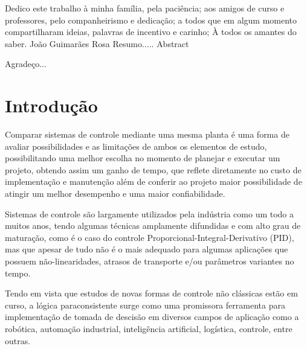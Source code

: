 \documentclass[12pt,a4paper]{report}
\begin{document}
\capa
\folhaderosto
\fichacatalografica
\folhadeaprovacao
\dedicatoria
{
      Dedico este trabalho à minha família, 
      pela paciência;
      aos amigos de curso e professores, 
      pelo companheirismo e dedicação;
      a todos que em algum momento compartilharam 
      ideias, palavras de incentivo e carinho;
      À todos os amantes do saber.
}
{ João Guimarães Rosa }
\resumo
{
Resumo.....
}
\resumolinguaestrangeira
{
Abstract
}

\agradecimentos
{
Agradeço...
}

\sumario

\listadefiguras

\listadetabelas

\onehalfspacing		%

\chapter{Introdução}
Comparar sistemas de controle mediante uma mesma planta é uma forma de avaliar possibilidades e as limitações de ambos os elementos de estudo, possibilitando uma melhor escolha no momento de planejar e executar um projeto, obtendo assim um ganho de tempo, que reflete diretamente no custo de implementação e manutenção além de conferir ao projeto maior possibilidade de atingir um melhor desempenho e uma maior confiabilidade. 

Sistemas de controle são largamente utilizados pela indústria como um todo a muitos anos, tendo algumas técnicas amplamente difundidas e com alto grau de maturação, como é o caso do controle Proporcional-Integral-Derivativo (PID),  mas que apesar de tudo não é o mais adequado para algumas aplicações que possuem não-linearidades, atrasos de transporte e/ou parâmetros variantes no tempo.\cite{Ferreira2012}



Tendo em vista que estudos de novas formas de controle não clássicas estão em curso, a lógica paraconsistente surge como uma promissora ferramenta para implementação de tomada de descisão em diversos campos de aplicação como a robótica, automação industrial, inteligência artificial, logística, controle, entre outras.\cite{JoaoInacio}
 
\end{document}
